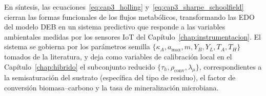 En síntesis, las ecuaciones~\eqref{eq:cap3_holling} y~\eqref{eq:cap3_sharpe_schoolfield} cierran las formas funcionales de los flujos metabólicos, transformando las EDO del modelo DEB en un sistema predictivo que responde a las variables ambientales medidas por los sensores IoT del Capítulo~\ref{chap:instrumentacion}. El sistema se gobierna por los parámetros semilla $\{\kappa_A, a_{\max}, m, Y_B, Y_L, T_A, T_H\}$ tomados de la literatura, y deja como variables de calibración local en el Capítulo~\ref{chap:hibrido} el subconjunto reducido $\{\tau_h, \rho_{\mathrm{conv}}, \lambda_{\mu}\}$, correspondientes a la semisaturación del sustrato (específica del tipo de residuo), el factor de conversión biomasa--carbono y la tasa de mineralización microbiana.